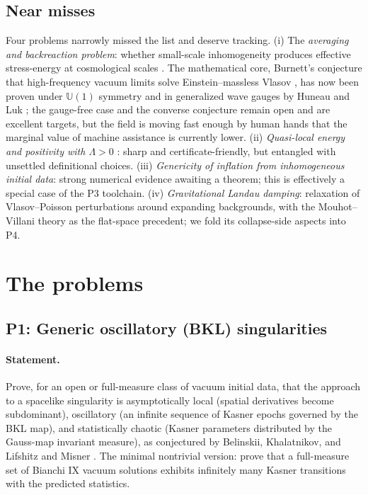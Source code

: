 \documentclass[11pt,letterpaper]{article}
\begin{document}
\subsection{Near misses}
\label{sec:nearmiss}

Four problems narrowly missed the list and deserve tracking. (i) The \emph{averaging and backreaction problem}: whether small-scale inhomogeneity produces effective stress-energy at cosmological scales \cite{buchert2000,greenwald2011}. The mathematical core, Burnett's conjecture that high-frequency vacuum limits solve Einstein--massless Vlasov \cite{burnett1989}, has now been proven under $\mathbb{U}(1)$ symmetry and in generalized wave gauges by Huneau and Luk \cite{huneauluk2024wave,huneauluk2024review}; the gauge-free case and the converse conjecture remain open and are excellent targets, but the field is moving fast enough by human hands that the marginal value of machine assistance is currently lower. (ii) \emph{Quasi-local energy and positivity with $\Lambda>0$} \cite{szabados2009}: sharp and certificate-friendly, but entangled with unsettled definitional choices. (iii) \emph{Genericity of inflation from inhomogeneous initial data}: strong numerical evidence \cite{east2016} awaiting a theorem; this is effectively a special case of the P3 toolchain. (iv) \emph{Gravitational Landau damping}: relaxation of Vlasov--Poisson perturbations around expanding backgrounds, with the Mouhot--Villani theory \cite{mouhotvillani2011} as the flat-space precedent; we fold its collapse-side aspects into P4.

\section{The problems}
\label{sec:problems}

\subsection{P1: Generic oscillatory (BKL) singularities}
\label{sec:p1}

\paragraph{Statement.} Prove, for an open or full-measure class of vacuum initial data, that the approach to a spacelike singularity is asymptotically local (spatial derivatives become subdominant), oscillatory (an infinite sequence of Kasner epochs governed by the BKL map), and statistically chaotic (Kasner parameters distributed by the Gauss-map invariant measure), as conjectured by Belinskii, Khalatnikov, and Lifshitz \cite{bkl1970,bkl1982} and Misner \cite{misner1969}. The minimal nontrivial version: prove that a full-measure set of Bianchi IX vacuum solutions exhibits infinitely many Kasner transitions with the predicted statistics.
\end{document}
